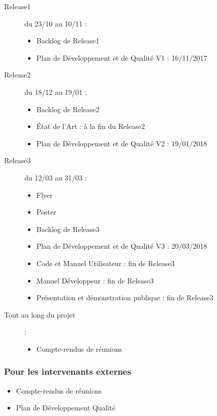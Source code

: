 \documentclass[10pt,a4paper]{article}
\begin{document}
\begin{description}

\item [Release1] du 23/10 au 10/11 : 
\begin{itemize}
\item Backlog de Release1
\item Plan de Développement et de Qualité V1 : 16/11/2017
\end{itemize}

\item [Release2] du 18/12 au 19/01  : 
\begin{itemize}
\item Backlog de Release2
\item État de l'Art : à la fin du Release2
\item Plan de Développement et de Qualité V2 : 19/01/2018
\end{itemize}

\item [Release3] du 12/03 au 31/03  : 
\begin{itemize}
\item Flyer
\item Poster
\item Backlog de Release3
\item Plan de Développement et de Qualité V3 : 20/03/2018
\item Code et Manuel Utilisateur : fin de Release3
\item Manuel Développeur : fin de Release3
\item Présentation et démonstration publique : fin de Release3
\end{itemize}

\item [Tout au long du projet] : 
\begin{itemize}
\item Compte-rendus de réunions 
\end{itemize}
\end{description}

\subsubsection{Pour les intervenants externes}
\begin{itemize}
\item Compte-rendus de réunions 
\item Plan de Développement Qualité
\end{itemize}
\end{document}
